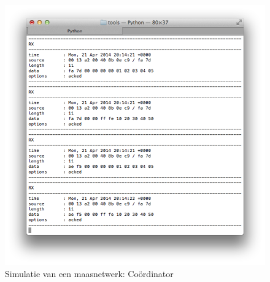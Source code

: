 \begin{figure}[ht]
  \centering
  \includegraphics[width=.7\linewidth]{../src/demo/network/coordinator.png}
  \vspace{-3mm}
  \caption{Simulatie van een maasnetwerk: Co\"ordinator}
  \label{fig:virtual-mesh-coordinator}
\end{figure}
